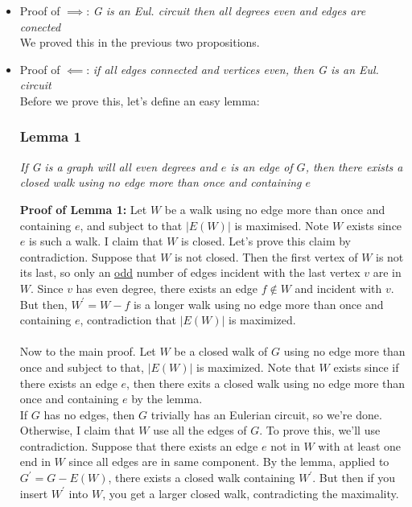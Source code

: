 \documentclass{report}
\begin{document}
\begin{itemize}
\item Proof of $\implies$: \textit{G is an Eul. circuit then all degrees even and edges are conected}\\
We proved this in the previous two propositions.
\item Proof of $\impliedby$: \textit{if all edges connected and vertices even, then G is an Eul. circuit}\\
Before we prove this, let's define an easy lemma:
\subsubsection{Lemma 1}
\begin{center}
\textit{If G is a graph will all even degrees and $e$ is an edge of $G$, then there exists a closed walk using no edge more than once and containing $e$}
\end{center}
\textbf{Proof of Lemma 1:} Let $W$ be a walk using no edge more than once and containing $e$, and subject to that $\vert E(W) \vert$ is maximised. Note $W$ exists since $e$ is such a walk. I claim that $W$ is closed.
Let's prove this claim by contradiction. Suppose that $W$ is not closed. Then the first vertex of $W$ is not its last, so only an \underline{odd} number of edges incident with the last vertex $v$ are in $W$. Since $v$ has even degree, there exists an edge $f \not\in W$ and incident with $v$. But then, $W^\prime = W - f$ is a longer walk using no edge more than once and containing $e$, contradiction that $\vert E(W)\vert$ is maximized.\\\\
Now to the main proof. Let $W$ be a closed walk of $G$ using no edge more than once and subject to that, $\vert E(W) \vert$ is maximized. Note that $W$ exists since if there exists an edge $e$, then there exits a closed walk using no edge more than once and containing $e$ by the lemma. \\
If $G$ has no edges, then $G$ trivially has an Eulerian circuit, so we're done. Otherwise, I claim that $W$ use all the edges of $G$. To prove this, we'll use contradiction. Suppose that there exists an edge $e$ not in $W$ with at least one end in $W$  since all edges are in same component. By the lemma, applied to $G^\prime = G - E(W)$, there exists a closed walk containing $W^\prime$. But then if you insert $W^\prime$ into $W$, you get a larger closed walk, contradicting the maximality.
\end{itemize}
\end{document}

